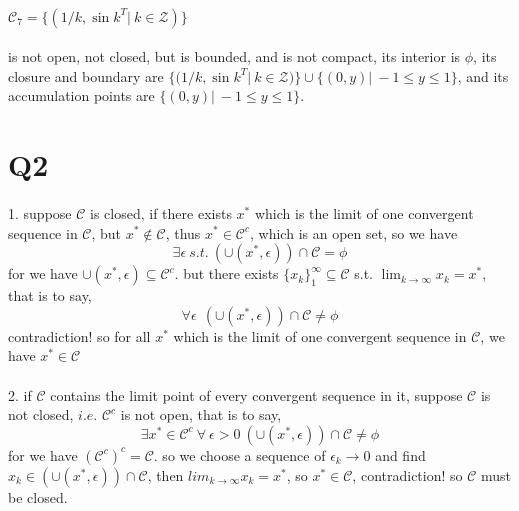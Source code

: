 \documentclass{article}
\begin{document}
  \paragraph{$\mathcal{C}_7 = \{(1 / k, \sin{k}^T|\ k \in \mathcal{Z})\}$}
    is not open, not closed, but is bounded, and is not compact, its interior is $\phi$, its closure and boundary are $\{(1 / k, \sin{k}^T|\ k \in \mathcal{Z})\} \cup \{(0, y)|\ -1 \leq y \leq 1\}$, and its accumulation points are $\{(0, y)|\ -1 \leq y \leq 1\}$.

\section{Q2}
  \paragraph{}
    1. suppose $\mathcal{C}$ is closed, if there exists $x^*$ which is the limit of one convergent sequence in $\mathcal{C}$, but $x^* \not\in \mathcal{C}$, thus $x^* \in \mathcal{C}^c$, which is an open set, so we have
    \begin{equation}
      \exists \epsilon\ s.t.\ (\cup(x^*, \epsilon)) \cap \mathcal{C} = \phi
    \end{equation}
    for we have $\cup(x^*, \epsilon) \subseteq \mathcal{C}^c$. but there exists $\{x_k\}_1^{\infty} \subseteq \mathcal{C}$ s.t. $\lim_{k \to \infty} x_k = x^*$, that is to say,
    \begin{equation}
      \forall \epsilon\ \ (\cup(x^*, \epsilon)) \cap \mathcal{C} \not= \phi
    \end{equation}
    contradiction! so for all $x^*$ which is the limit of one convergent sequence in $\mathcal{C}$, we have $x^* \in \mathcal{C}$
    \paragraph{}
      2. if $\mathcal{C}$ contains the limit point of every convergent sequence in it, suppose $\mathcal{C}$ is not closed, $i.e.$ $\mathcal{C}^c$ is not open, that is to say,
      \begin{equation}
        \exists x^* \in \mathcal{C}^c\ \forall\ \epsilon > 0\ (\cup(x^*, \epsilon)) \cap \mathcal{C} \not= \phi
      \end{equation}
      for we have $(\mathcal{C}^c)^c = \mathcal{C}$. so we choose a sequence of $\epsilon_k \to 0$ and find $x_k \in (\cup(x^*, \epsilon)) \cap \mathcal{C}$, then $lim_{k \to \infty} x_k = x^*$, so $x^* \in \mathcal{C}$, contradiction! so $\mathcal{C}$ must be closed.
\end{document}
